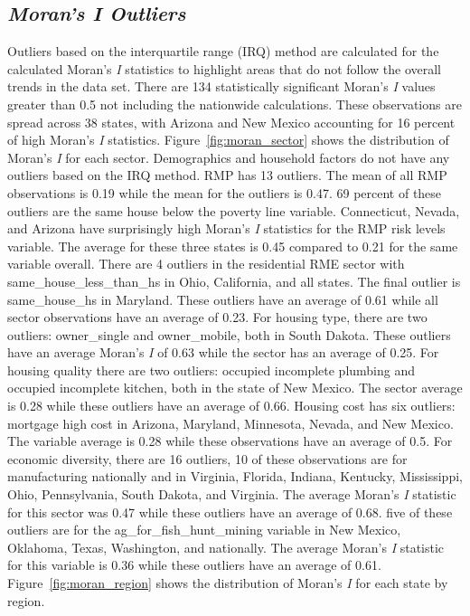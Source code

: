 \subsection{\textit{Moran's I Outliers}}
Outliers based on the interquartile range (IRQ) method are calculated for the calculated Moran's \textit{I} statistics to highlight areas that do not follow the overall trends in the data set. There are 134 statistically significant Moran's \textit{I} values greater than 0.5 not including the nationwide calculations. These observations are spread across 38 states, with Arizona and New Mexico accounting for 16 percent of high Moran's \textit{I} statistics. Figure~\ref{fig:moran_sector} shows the distribution of Moran's \textit{I} for each sector. Demographics and household factors do not have any outliers based on the IRQ method. RMP has 13 outliers. The mean of all RMP observations is 0.19 while the mean for the outliers is 0.47. 69 percent of these outliers are the same house below the poverty line variable. Connecticut, Nevada, and Arizona have surprisingly high Moran’s \textit{I} statistics for the RMP risk levels variable. The average for these three states is 0.45 compared to 0.21 for the same variable overall. There are 4 outliers in the residential RME sector with same\_house\_less\_than\_hs in Ohio, California, and all states. The final outlier is same\_house\_hs in Maryland. These outliers have an average of 0.61 while all sector observations have an average of 0.23. For housing type, there are two outliers: owner\_single and owner\_mobile, both in South Dakota. These outliers have an average Moran’s \textit{I} of 0.63 while the sector has an average of 0.25. For housing quality there are two outliers: occupied incomplete plumbing and occupied incomplete kitchen, both in the state of New Mexico. The sector average is 0.28 while these outliers have an average of 0.66. Housing cost has six outliers: mortgage high cost in Arizona, Maryland, Minnesota, Nevada, and New Mexico. The variable average is 0.28 while these observations have an average of 0.5. For economic diversity, there are 16 outliers, 10 of these observations are for manufacturing nationally and in Virginia, Florida, Indiana, Kentucky, Mississippi, Ohio, Pennsylvania, South Dakota, and Virginia. The average Moran’s \textit{I} statistic for this sector was 0.47 while these outliers have an average of 0.68. five of these outliers are for the ag\_for\_fish\_hunt\_mining variable in New Mexico, Oklahoma, Texas, Washington, and nationally. The average Moran’s \textit{I} statistic for this variable is 0.36 while these outliers have an average of 0.61. Figure~\ref{fig:moran_region} shows the distribution of Moran's \textit{I} for each state by region.

